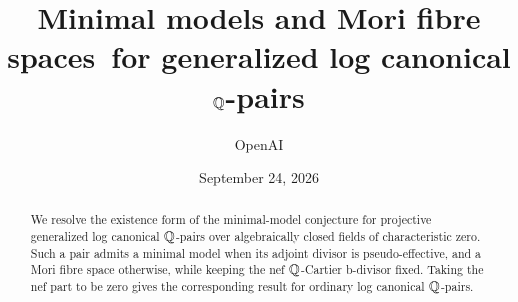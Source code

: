 \documentclass[11pt]{amsart}
\title[Minimal models for generalized lc $\Q$-pairs]{Minimal models and Mori fibre spaces\allowbreak\ for generalized log canonical $\Q$-pairs}
\author{OpenAI}
\date{September 24, 2026}
\begin{document}
\begin{abstract}
We resolve the existence form of the minimal-model conjecture for projective
generalized log canonical $\Q$-pairs over algebraically closed fields of
characteristic zero. Such a pair admits a minimal model when its adjoint
divisor is pseudo-effective, and a Mori fibre space otherwise, while keeping
the nef $\Q$-Cartier b-divisor fixed. Taking the nef part to be zero gives
the corresponding result for ordinary log canonical $\Q$-pairs.
\end{abstract}
\maketitle
\setcounter{tocdepth}{1}
\tableofcontents
\clearpage


\clearpage













\end{document}
